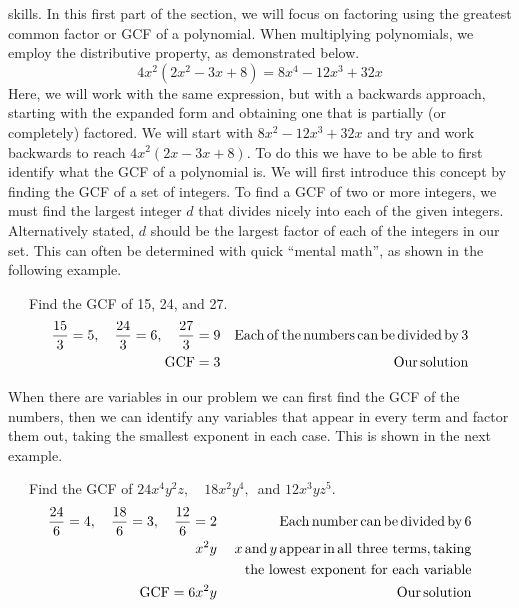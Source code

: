 skills.\pp
In this first part of the section, we will focus on factoring using the greatest common factor or
GCF of a polynomial.  When multiplying polynomials, we employ the distributive property, as demonstrated below.
$$4 x^2 (2 x^2 - 3 x + 8) = 8 x^4 - 12 x^3 + 32 x$$
Here, we will work with the same expression, but with a backwards approach, starting with the expanded form and obtaining one that is partially (or completely) factored.\pp
We will start with $8 x^2 - 12 x^3 + 32 x$ and try and work backwards to reach $4 x^2 (2 x - 3 x + 8)$.\pp
To do this we have to be able to first identify what the GCF of a
polynomial is. We will first introduce this concept by finding the GCF of
a set of integers. To find a GCF of two or more integers, we must find the
largest integer $d$ that divides nicely into each of the given integers.  Alternatively stated, $d$ should be the largest factor of each of the integers in our set.  This can often be determined with quick ``mental math'', as shown in the following example.

\begin{example}~~~Find the GCF of 15, 24, and 27.%
  \begin{eqnarray*}
    \frac{15}{3} = 5,~~~ \frac{24}{3} = 6,~~~ \frac{27}{3} = 9 &  & \operatorname{Each}
    \operatorname{of} \operatorname{the} \operatorname{numbers} \operatorname{can} \operatorname{be} \operatorname{divided}
    \operatorname{by} 3\\
    \operatorname{GCF} = 3 &  & \operatorname{Our} \operatorname{solution}
  \end{eqnarray*}
\end{example}

When there are variables in our problem we can first find the GCF of the
numbers, then we can identify any variables that appear in every term and factor them out, taking the smallest exponent in each case. This is shown in the next example.

\begin{example}~~~Find the GCF of $24 x^4 y^2 z,$~~$18 x^2 y^4,$~and $12 x^3 y z^5$.
  \begin{eqnarray*}
    \frac{24}{6} = 4,~~~ \frac{18}{6} = 3,~~~ \frac{12}{6} = 2 &  & \operatorname{Each}
    \operatorname{number} \operatorname{can} \operatorname{be} \operatorname{divided} \operatorname{by} 6\\
    x^2 y &  & x \operatorname{and} y \operatorname{appear} \operatorname{in} \operatorname{all~three~terms}, \operatorname{taking}\\
		& & ~~~\text{the~lowest~exponent~for~each~variable}\\
    \operatorname{GCF} = 6 x^2 y &  & \operatorname{Our} \operatorname{solution}
  \end{eqnarray*}
\end{example}
  
